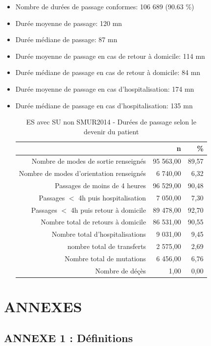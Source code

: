 \documentclass[]{article}
\begin{document}
\begin{itemize}
\itemsep1pt\parskip0pt
\item
  Nombre de durées de passage conformes: 106 689 (90.63 \%)
\item
  Durée moyenne de passage: 120 mn
\item
  Durée médiane de passage: 87 mn
\item
  Durée moyenne de passage en cas de retour à domicile: 114 mn
\item
  Durée médiane de passage en cas de retour à domicile: 84 mn
\item
  Durée moyenne de passage en cas d'hospitalisation: 174 mn
\item
  Durée médiane de passage en cas d'hospitalisation: 135 mn

  \begin{table}[ht]
  \centering
  \begin{tabular}{rrr}
    \hline
   & n & \% \\ 
    \hline
  Nombre de modes de sortie renseignés & 95 563,00 & 89,57 \\ 
    Nombre de modes d'orientation renseignés & 6 740,00 & 6,32 \\ 
    Passages de moins de 4 heures & 96 529,00 & 90,48 \\ 
    Passages $<$ 4h puis hospitalisation & 7 050,00 & 7,30 \\ 
    Passages $<$ 4h puis retour à domicile & 89 478,00 & 92,70 \\ 
    Nombre total de retours à domicile & 86 531,00 & 90,55 \\ 
    Nombre total d'hospitalisations & 9 031,00 & 9,45 \\ 
    nombre total de transferts & 2 575,00 & 2,69 \\ 
    Nombre total de mutations & 6 456,00 & 6,76 \\ 
    Nombre de déçès & 1,00 & 0,00 \\ 
     \hline
  \end{tabular}
  \caption{ES avec SU non SMUR2014 - Durées de passage selon le devenir du patient} 
  \end{table}
\end{itemize}

\section{ANNEXES}\label{annexes}

\subsection{ANNEXE 1 : Définitions}\label{annexe-1-definitions}
\end{document}
